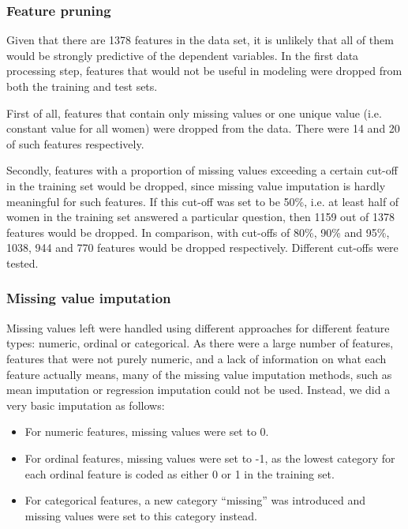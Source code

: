 \documentclass{article}\usepackage[]{graphicx}\usepackage[]{color}
\begin{document}
\subsubsection{Feature pruning}
Given that there are 1378 features in the data set, it is unlikely that all of them would be strongly predictive of the dependent variables. In the first data processing step, features that would not be useful in modeling were dropped from both the training and test sets.

First of all, features that contain only missing values or one unique value (i.e. constant value for all women) were dropped from the data. There were 14 and 20 of such features respectively.

Secondly, features with a proportion of missing values exceeding a certain cut-off in the training set would be dropped, since missing value imputation is hardly meaningful for such features. If this cut-off was set to be 50\%, i.e. at least half of women in the training set answered a particular question, then 1159 out of 1378 features would be dropped. In comparison, with cut-offs of 80\%, 90\% and 95\%, 1038, 944 and 770 features would be dropped respectively. Different cut-offs were tested.

\subsubsection{Missing value imputation}
Missing values left were handled using different approaches for different feature types: numeric, ordinal or categorical. As there were a large number of features, features that were not purely numeric, and a lack of information on what each feature actually means, many of the missing value imputation methods, such as mean imputation or regression imputation could not be used. Instead, we did a very basic imputation as follows:
  \begin{itemize}
\item For numeric features, missing values were set to 0.
\item For ordinal features, missing values were set to -1, as the lowest category for each ordinal feature is coded as either 0 or 1 in the training set.
\item For categorical features, a new category ``missing'' was introduced and missing values were set to this category instead.
\end{itemize}
\end{document}
